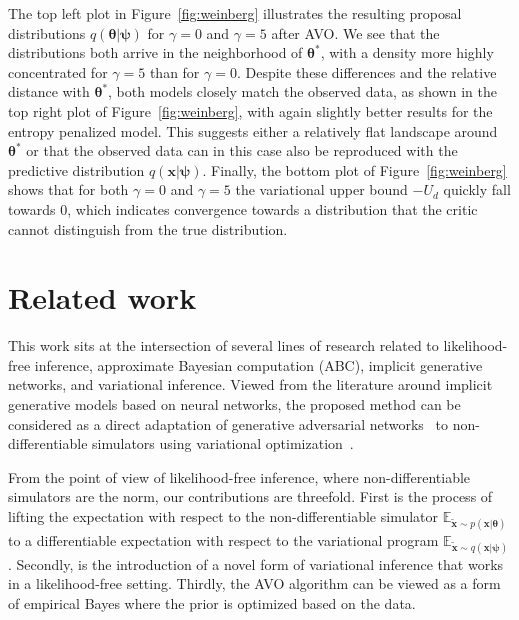 \documentclass[twocolumn,superscriptaddress,aps]{revtex4-1}
\newcommand{\qxpsi}{q(\mathbf{x}|\bfpsi)}
\newcommand{\bftheta}{{\bm \theta}}
\newcommand{\bfpsi}{{\bm \psi}}
\newcommand{\bfx}{\mathbf{x}}
\theoremstyle{plain}
\begin{document}
The top left plot in Figure~\ref{fig:weinberg} illustrates the resulting
proposal distributions $q(\bftheta|\bfpsi)$ for $\gamma=0$ and $\gamma=5$ after
AVO. We see that the distributions both arrive
in the neighborhood of $\bftheta^*$, with a density  more highly concentrated for
$\gamma=5$ than for $\gamma=0$.  Despite these differences and the relative
distance with $\bftheta^*$, both models closely match the observed data, as shown
in the top right plot of  Figure~\ref{fig:weinberg}, with again slightly better
results for the entropy penalized model. This suggests either a relatively flat
landscape around $\bftheta^*$ or that the observed data can in this case also be
reproduced with the  predictive distribution $\qxpsi$.
Finally, the bottom plot of Figure~\ref{fig:weinberg} shows that for both
$\gamma=0$ and $\gamma=5$ the variational upper bound $-U_d$ quickly fall
towards $0$, which indicates  convergence towards a distribution that the critic
cannot distinguish from the true distribution.



\section{Related work}

This work sits at the intersection of several lines of research related to
likelihood-free inference, approximate Bayesian computation (ABC),
implicit generative networks, and variational inference.
Viewed from the literature around implicit generative models based on neural networks,
the proposed method can be considered as a direct adaptation of
generative adversarial networks~\citep{goodfellow2014generative,2017arXiv170104862A, 2017arXiv170107875A} to
non-differentiable simulators using variational optimization~\cite{2012arXiv1212.4507S,staines2013optimization}.

From the point of view of likelihood-free inference, where  non-differentiable
simulators are the norm, our contributions are threefold. First is the process
of lifting the expectation with respect to the non-differentiable simulator
$\mathbb{E}_{\tilde{\bfx} \sim p(\bfx | \bftheta)}$ to a differentiable
expectation with respect to the variational program $\mathbb{E}_{\tilde{\bfx}
\sim q(\bfx | \bfpsi)}$. Secondly, is the introduction of a novel form of
variational inference that works in a likelihood-free setting. Thirdly, the
AVO algorithm can be viewed as a form of empirical Bayes where the prior is
optimized based on the data.
\end{document}
